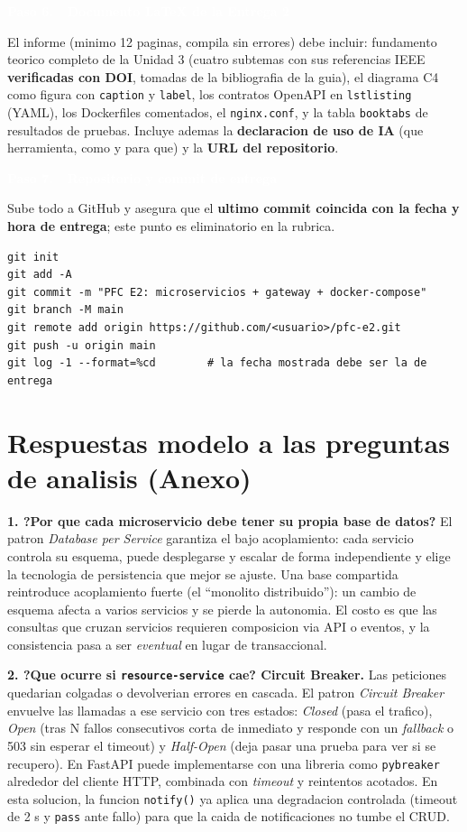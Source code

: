 \documentclass[11pt]{article}
\newcommand{\pasohead}[2]{%
\vspace{4pt}%
\begin{tcolorbox}[colback=azulMedio,colframe=azulMedio,boxrule=0pt,arc=2pt,left=8pt,right=8pt,top=4pt,bottom=4pt]
\textcolor{white}{\textbf{Paso #1.\ \ #2}}\end{tcolorbox}}
\begin{document}
\pasohead{6}{Documento LaTeX de la Entrega 2}
El informe (minimo 12 paginas, compila sin errores) debe incluir: fundamento teorico completo de la Unidad 3 (cuatro subtemas con sus referencias IEEE \textbf{verificadas con DOI}, tomadas de la bibliografia de la guia), el diagrama C4 como figura con \texttt{caption} y \texttt{label}, los contratos OpenAPI en \texttt{lstlisting} (YAML), los Dockerfiles comentados, el \texttt{nginx.conf}, y la tabla \texttt{booktabs} de resultados de pruebas. Incluye ademas la \textbf{declaracion de uso de IA} (que herramienta, como y para que) y la \textbf{URL del repositorio}.

\pasohead{7}{Repositorio y commit de entrega}
Sube todo a GitHub y asegura que el \textbf{ultimo commit coincida con la fecha y hora de entrega}; este punto es eliminatorio en la rubrica.
\begin{lstlisting}[language=shell]
git init
git add -A
git commit -m "PFC E2: microservicios + gateway + docker-compose"
git branch -M main
git remote add origin https://github.com/<usuario>/pfc-e2.git
git push -u origin main
git log -1 --format=%cd        # la fecha mostrada debe ser la de entrega
\end{lstlisting}

\section*{\textcolor{azulOscuro}{Respuestas modelo a las preguntas de analisis (Anexo)}}
\textbf{1. ?Por que cada microservicio debe tener su propia base de datos?} El patron \emph{Database per Service} garantiza el bajo acoplamiento: cada servicio controla su esquema, puede desplegarse y escalar de forma independiente y elige la tecnologia de persistencia que mejor se ajuste. Una base compartida reintroduce acoplamiento fuerte (el ``monolito distribuido''): un cambio de esquema afecta a varios servicios y se pierde la autonomia. El costo es que las consultas que cruzan servicios requieren composicion via API o eventos, y la consistencia pasa a ser \emph{eventual} en lugar de transaccional.

\textbf{2. ?Que ocurre si \texttt{resource-service} cae? Circuit Breaker.} Las peticiones quedarian colgadas o devolverian errores en cascada. El patron \emph{Circuit Breaker} envuelve las llamadas a ese servicio con tres estados: \emph{Closed} (pasa el trafico), \emph{Open} (tras N fallos consecutivos corta de inmediato y responde con un \emph{fallback} o 503 sin esperar el timeout) y \emph{Half-Open} (deja pasar una prueba para ver si se recupero). En FastAPI puede implementarse con una libreria como \texttt{pybreaker} alrededor del cliente HTTP, combinada con \emph{timeout} y reintentos acotados. En esta solucion, la funcion \texttt{notify()} ya aplica una degradacion controlada (timeout de 2 s y \texttt{pass} ante fallo) para que la caida de notificaciones no tumbe el CRUD.
\end{document}
